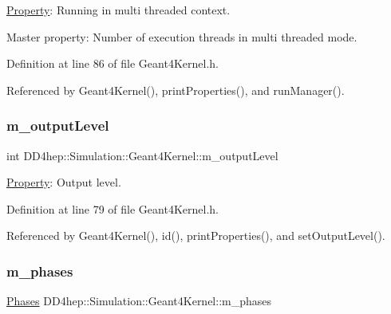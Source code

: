 \hyperlink{class_d_d4hep_1_1_property}{Property}\+: Running in multi threaded context. 

Master property\+: Number of execution threads in multi threaded mode. 

Definition at line 86 of file Geant4\+Kernel.\+h.



Referenced by Geant4\+Kernel(), print\+Properties(), and run\+Manager().

\hypertarget{class_d_d4hep_1_1_simulation_1_1_geant4_kernel_a419eed43ed023a0b43a2ddc44f474708}{}\label{class_d_d4hep_1_1_simulation_1_1_geant4_kernel_a419eed43ed023a0b43a2ddc44f474708} 
\subsubsection{\texorpdfstring{m\+\_\+output\+Level}{m\_outputLevel}}
{\footnotesize\ttfamily int D\+D4hep\+::\+Simulation\+::\+Geant4\+Kernel\+::m\+\_\+output\+Level\hspace{0.3cm}{\ttfamily [protected]}}



\hyperlink{class_d_d4hep_1_1_property}{Property}\+: Output level. 



Definition at line 79 of file Geant4\+Kernel.\+h.



Referenced by Geant4\+Kernel(), id(), print\+Properties(), and set\+Output\+Level().

\hypertarget{class_d_d4hep_1_1_simulation_1_1_geant4_kernel_aa1357848649b7fccb42bbaa0c5f88f58}{}\label{class_d_d4hep_1_1_simulation_1_1_geant4_kernel_aa1357848649b7fccb42bbaa0c5f88f58} 
\subsubsection{\texorpdfstring{m\+\_\+phases}{m\_phases}}
{\footnotesize\ttfamily \hyperlink{class_d_d4hep_1_1_simulation_1_1_geant4_kernel_ae28985781d4226ece4c3fffe8827b400}{Phases} D\+D4hep\+::\+Simulation\+::\+Geant4\+Kernel\+::m\+\_\+phases\hspace{0.3cm}{\ttfamily [protected]}}



